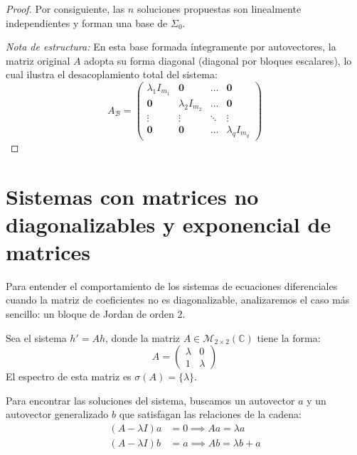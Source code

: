\begin{proof}
    Por consiguiente, las $n$ soluciones propuestas son linealmente independientes y forman una base de $\Sigma_0$.
    
    \vspace{0.5cm}
    \textit{Nota de estructura:} En esta base formada íntegramente por autovectores, la matriz original $A$ adopta su forma diagonal (diagonal por bloques escalares), lo cual ilustra el desacoplamiento total del sistema:
    \[
        A_{\mathcal{B}} = \begin{pmatrix}
        \lambda_1 I_{m_1} & \mathbf{0} & \dots & \mathbf{0} \\
        \mathbf{0} & \lambda_2 I_{m_2} & \dots & \mathbf{0} \\
        \vdots & \vdots & \ddots & \vdots \\
        \mathbf{0} & \mathbf{0} & \dots & \lambda_q I_{m_q}
        \end{pmatrix}
    \]
\end{proof}


\section{Sistemas con matrices no diagonalizables y exponencial de matrices}

Para entender el comportamiento de los sistemas de ecuaciones diferenciales cuando la matriz de coeficientes no es diagonalizable, analizaremos el caso más sencillo: un bloque de Jordan de orden 2.

Sea el sistema $h' = Ah$, donde la matriz $A \in \mathcal{M}_{2 \times 2}(\mathbb{C})$ tiene la forma:
\[
    A = \begin{pmatrix} \lambda & 0 \\ 1 & \lambda \end{pmatrix}
\]
El espectro de esta matriz es $\sigma(A) = \{\lambda\}$. 

Para encontrar las soluciones del sistema, buscamos un autovector $a$ y un autovector generalizado $b$ que satisfagan las relaciones de la cadena:
\begin{align*}
    (A - \lambda I)a &= 0 \implies Aa = \lambda a \\
    (A - \lambda I)b &= a \implies Ab = \lambda b + a
\end{align*}

